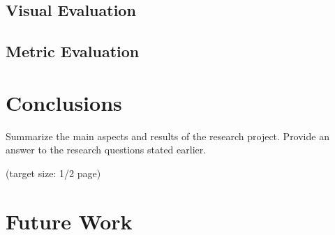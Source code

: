 \documentclass[a4paper,11pt,oneside]{article}
\begin{document}
  \subsection{Visual Evaluation}
  \subsection{Metric Evaluation}

  \section{Conclusions}

  Summarize the main aspects and results of the research
  project. Provide an answer to the research questions stated earlier.

  (target size: 1/2 page)

  \section{Future Work}

  \newpage

  \printbibliography
\end{document}
